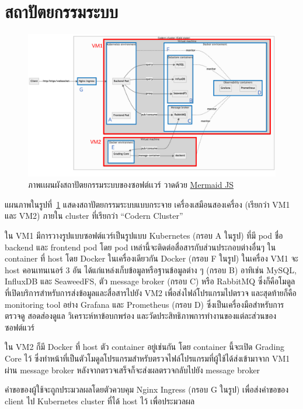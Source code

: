 \documentclass[12pt,oneside,openright,a4paper]{cpe-thai-project}
\begin{document}
\hypertarget{arch-section}{\section{สถาปัตยกรรมระบบ}}
    \begin{figure}[!h]
    \centering
        \includegraphics[width=15cm]{figure/diagram/architecture-v1.png}
    \caption[ภาพเเผนผังสถาปัตยกรรมระบบของซอฟต์เเวร์]{ภาพเเผนผังสถาปัตยกรรมระบบของซอฟต์เเวร์ วาดด้วย \href{https://mermaid.js.org/}{Mermaid JS}}\label{fig:arch}
    \end{figure}
    \begin{flushleft}
    แผนภาพในรูปที่~\ref{fig:arch} แสดงสถาปัตยกรรมระบบแบบกระจาย เครื่องเสมือนสองเครื่อง (เรียกว่า VM1 และ VM2) ภายใน cluster ที่เรียกว่า “Codern Cluster”
    \end{flushleft}
    \begin{flushleft}
    ใน VM1 มีการวางรูปแบบซอฟต์แวร์เป็นรูปแบบ Kubernetes (กรอบ A ในรูป) ที่มี pod ชื่อ backend และ frontend pod โดย pod เหล่านี้จะติดต่อสื่อสารกับส่วนประกอบต่างอื่นๆ ใน container ที่ host โดย Docker ในเครื่องเดียวกัน Docker (กรอบ F ในรูป) ในเครื่อง VM1 จะ host คอนเทนเนอร์ 3 อัน ได้แก่แหล่งเก็บข้อมูลหรือฐานข้อมูลต่าง ๆ (กรอบ B) อาทิเช่น MySQL, InfluxDB และ SeaweedFS, ตัว message broker (กรอบ C) หรือ RabbitMQ ซึ่งก็คือโมดูล ที่เปิดบริการสำหรับการส่งข้อมูลและสื่อสารไปยัง VM2 เพื่อส่งไฟล์โปรแกรมไปตรวจ และสุดท้ายก็คือ monitoring tool อย่าง Grafana และ Prometheus (กรอบ D) ซึ่งเป็นเครื่องมือสำหรับการตรวจดู สอดส่องดูแล วิเคราะห์หาข้อบกพร่อง และวัดประสิทธิภาพการทำงานของแต่ละส่วนของซอฟต์แวร์
    \end{flushleft}
    \begin{flushleft} 
    ใน VM2 ก็มี Docker ที่ host ตัว container อยู่เช่นกัน โดย container นี้จะเปิด Grading Core ไว้ ซึ่งทำหน้าที่เป็นตัวโมดูลโปรแกรมสำหรับตรวจไฟล์โปรแกรมที่ผู้ใช้ได้ส่งเข้ามาจาก VM1 ผ่าน message broker หลังจากตรวจเสร็จก็จะส่งผลตรวจกลับไปยัง message broker
    \end{flushleft}
    \begin{flushleft}
    คำขอของผู้ใช้จะถูกประมวลผลโดยตัวควบคุม Nginx Ingress (กรอบ G ในรูป) เพื่อส่งคำขอของ client ไป Kubernetes cluster ที่ได้ host ไว้ เพื่อประมวลผล
    \end{flushleft}
\end{document}
